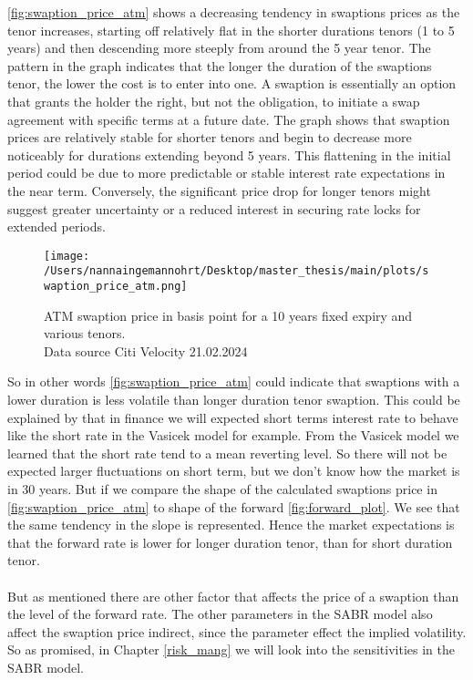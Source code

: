 \autoref{fig:swaption_price_atm} shows a decreasing tendency in swaptions prices as the tenor increases,
starting off relatively flat in the shorter durations tenors (1 to 5 years) and then 
descending more steeply from around the 5 year tenor. 
The pattern in the graph indicates that the longer the duration of the swaptions tenor, 
the lower the cost is to enter into one. A swaption is essentially an option that grants the 
holder the right, but not the obligation, to initiate a swap agreement with specific terms at a future date. 
The graph shows that swaption prices are relatively stable for shorter tenors and begin to 
decrease more noticeably for durations extending beyond 5 years. 
This flattening in the initial period could be due to more predictable or stable interest 
rate expectations in the near term. Conversely, the significant price drop for longer 
tenors might suggest greater uncertainty or a reduced interest in securing rate locks for extended periods.
\begin{figure}[H]
    \centering
    \texttt{[image: /Users/nannaingemannohrt/Desktop/master\_thesis/main/plots/swaption\_price\_atm.png]}
    \caption{ATM swaption price in basis point for a 10 years fixed expiry and various tenors.
    \\ Data source  Citi Velocity 21.02.2024}
    \label{fig:swaption_price_atm}
\end{figure}
\noindent
So in other words \autoref{fig:swaption_price_atm}  could indicate that swaptions with a lower duration is less
volatile than longer duration tenor swaption. This could be explained by that in finance we will 
expected short terms interest rate to behave like the short rate in the Vasicek model for example. 
From the Vasicek model we learned that the short rate tend to a mean reverting level. 
So there will not be expected larger fluctuations on short term, but we don't know how the market is in 
30 years. But if we compare the shape of the calculated swaptions price in \autoref{fig:swaption_price_atm} 
to shape of the forward \autoref{fig:forward_plot}. We see that the same tendency in the slope 
is represented. Hence the market expectations is that the forward rate is lower for longer duration tenor, 
than for short duration tenor. 
\\\\
But as mentioned there are other factor that affects the price of a swaption than the level of the forward rate. 
The other parameters in the SABR model also affect the swaption price indirect, 
since the parameter effect the implied volatility. 
So as promised, in Chapter \ref{risk_mang} we will look into the sensitivities in the SABR model.
